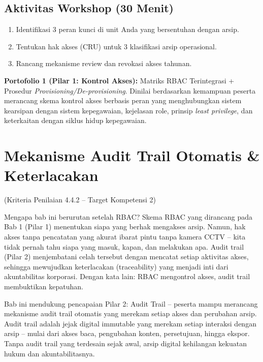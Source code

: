 \documentclass[12pt,a4paper]{report}
\begin{document}

\section{Aktivitas Workshop (30 Menit)}
\begin{enumerate}[leftmargin=*]
    \item Identifikasi 3 peran kunci di unit Anda yang bersentuhan dengan arsip.
    \item Tentukan hak akses (CRU) untuk 3 klasifikasi arsip operasional.
    \item Rancang mekanisme review dan revokasi akses tahunan.
\end{enumerate}

\begin{outputbox}
\textbf{Portofolio 1 (Pilar 1: Kontrol Akses):} Matriks RBAC Terintegrasi + Prosedur \textit{Provisioning/De-provisioning}. Dinilai berdasarkan kemampuan peserta merancang skema kontrol akses berbasis peran yang menghubungkan sistem kearsipan dengan sistem kepegawaian, kejelasan role, prinsip \textit{least privilege}, dan keterkaitan dengan siklus hidup kepegawaian.
\end{outputbox}

\chapter{Mekanisme Audit Trail Otomatis \& Keterlacakan}
(Kriteria Penilaian 4.4.2 -- Target Kompetensi 2)

Mengapa bab ini berurutan setelah RBAC? Skema RBAC yang dirancang pada Bab 1 (Pilar 1) menentukan siapa yang berhak mengakses arsip. Namun, hak akses tanpa pencatatan yang akurat ibarat pintu tanpa kamera CCTV -- kita tidak pernah tahu siapa yang masuk, kapan, dan melakukan apa. Audit trail (Pilar 2) menjembatani celah tersebut dengan mencatat setiap aktivitas akses, sehingga mewujudkan keterlacakan (traceability) yang menjadi inti dari akuntabilitas korporasi. Dengan kata lain: RBAC mengontrol akses, audit trail membuktikan kepatuhan.

Bab ini mendukung pencapaian Pilar 2: Audit Trail -- peserta mampu merancang mekanisme audit trail otomatis yang merekam setiap akses dan perubahan arsip. Audit trail adalah jejak digital immutable yang merekam setiap interaksi dengan arsip -- mulai dari akses baca, pengubahan konten, persetujuan, hingga ekspor. Tanpa audit trail yang terdesain sejak awal, arsip digital kehilangan kekuatan hukum dan akuntabilitasnya.
\end{document}
